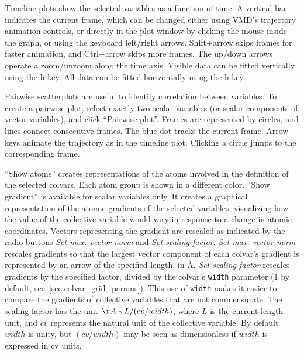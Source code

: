 {

Timeline plots show the selected variables as a function of time. A vertical bar indicates the current frame, which can be changed either using VMD's trajectory animation controls, or directly in the plot window by clicking the mouse inside the graph, or using the keyboard left/right arrows.
Shift+arrow skips frames for faster animation, and Ctrl+arrow skips more frames.
The up/down arrows operate a zoom/unzoom along the time axis.
Visible data can be fitted vertically using the h key. All data can be fitted horizontally using the h key.

Pairwise scatterplots are useful to identify correlation between variables. To create a pairwise plot, select exactly two scalar variables (or scalar components of vector variables), and click ``Pairwise plot''.
Frames are represented by circles, and lines connect consecutive frames.
The blue dot tracks the current frame.
Arrow keys animate the trajectory as in the timeline plot.
Clicking a circle jumps to the corresponding frame.

``Show atoms'' creates representations of the atoms involved in the definition of the selected colvars.
Each atom group is shown in a different color.
``Show gradient'' is available for scalar variables only.
It creates a graphical representation of the atomic gradients of the selected variables, visualizing how the value of the collective variable would vary in response to a change in atomic coordinates.
Vectors representing the gradient are rescaled as indicated by the radio buttons \emph{Set max. vector norm} and \emph{Set scaling factor}.
\emph{Set max. vector norm} rescales gradients so that the largest vector component of each colvar's gradient is represented by an arrow of the specified length, in \AA.
\emph{Set scaling factor} rescales gradients by the specified factor, divided by the colvar's \texttt{width} parameter (1 by default, see~\ref{sec:colvar_grid_params}).
This use of \texttt{width} makes it easier to compare the gradients of collective variables that are not commensurate.
The scaling factor has the unit $\AA * L / (cv / width)$, where $L$ is the current length unit, and $cv$ represents the natural unit of the collective variable.
By default $width$ is unity, but $(cv / width)$ may be seen as dimensionless if $width$ is expressed in cv units.

}
